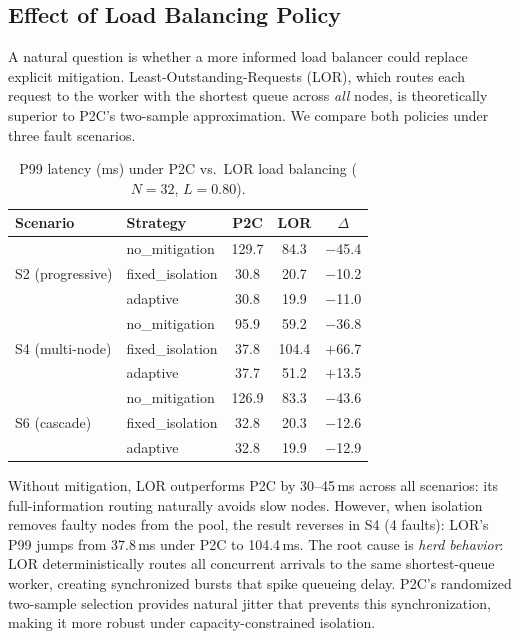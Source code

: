 \subsection{Effect of Load Balancing Policy}
\label{sec:eval-lor}

A natural question is whether a more informed load balancer could
replace explicit mitigation. Least-Outstanding-Requests (LOR), which
routes each request to the worker with the shortest queue across
\emph{all} nodes, is theoretically superior to P2C's two-sample
approximation. We compare both policies under three fault scenarios.

\begin{table}[t]
\centering
\caption{P99 latency (ms) under P2C vs.\ LOR load balancing
  ($N = 32$, $L = 0.80$).}
\label{tab:lor}
\footnotesize
\begin{tabular}{@{}llccc@{}}
\toprule
Scenario & Strategy & P2C & LOR & $\Delta$ \\
\midrule
\multirow{3}{*}{S2 (progressive)}
  & no\_mitigation   & 129.7 & 84.3  & $-$45.4 \\
  & fixed\_isolation & 30.8  & 20.7  & $-$10.2 \\
  & adaptive         & 30.8  & 19.9  & $-$11.0 \\
\midrule
\multirow{3}{*}{S4 (multi-node)}
  & no\_mitigation   & 95.9  & 59.2  & $-$36.8 \\
  & fixed\_isolation & 37.8  & 104.4 & $+$66.7 \\
  & adaptive         & 37.7  & 51.2  & $+$13.5 \\
\midrule
\multirow{3}{*}{S6 (cascade)}
  & no\_mitigation   & 126.9 & 83.3  & $-$43.6 \\
  & fixed\_isolation & 32.8  & 20.3  & $-$12.6 \\
  & adaptive         & 32.8  & 19.9  & $-$12.9 \\
\bottomrule
\end{tabular}
\end{table}

Without mitigation, LOR outperforms P2C by 30--45\,ms across all
scenarios: its full-information routing naturally avoids slow nodes.
However, when isolation removes faulty nodes from the pool, the result
reverses in S4 (4 faults): LOR's P99 jumps from 37.8\,ms under P2C to
104.4\,ms. The root cause is \emph{herd behavior}: LOR
deterministically routes all concurrent arrivals to the same
shortest-queue worker, creating synchronized bursts that spike
queueing delay. P2C's randomized two-sample selection provides natural
jitter that prevents this synchronization, making it more robust under
capacity-constrained isolation.

